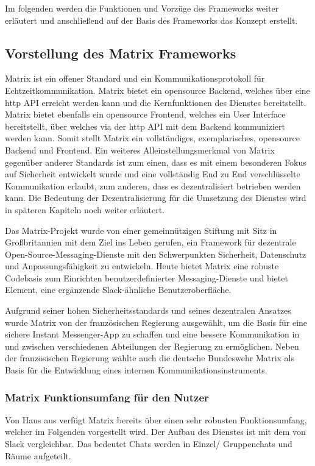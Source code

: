 Im folgenden werden die Funktionen und Vorzüge des Frameworks weiter erläutert und anschließend auf der Basis des Frameworks das Konzept erstellt. 

\subsection{Vorstellung des Matrix Frameworks}\label{chapter:vdmf}
Matrix ist ein offener Standard und ein Kommunikationsprotokoll für  Echtzeitkommunikation. Matrix bietet ein opensource Backend, welches über eine http API erreicht werden kann und die Kernfunktionen des Dienstes bereitstellt. Matrix bietet ebenfalls ein opensource Frontend, welches ein User Interface bereitstellt, über welches via der http API mit dem Backend kommuniziert werden kann. Somit stellt Matrix ein vollständiges, exemplarisches, opensource Backend und Frontend. Ein weiteres Alleinstellungsmerkmal von Matrix gegenüber anderer Standards ist zum einen, dass es mit einem besonderen Fokus auf Sicherheit entwickelt wurde und eine vollständig End zu End verschlüsselte Kommunikation  erlaubt, zum anderen, dass es dezentralisiert betrieben werden kann. Die Bedeutung der Dezentralisierung für die Umsetzung des Dienstes wird in späteren Kapiteln noch weiter erläutert.

Das Matrix-Projekt wurde von einer gemeinnützigen Stiftung mit Sitz in Großbritannien mit dem Ziel ins Leben gerufen, ein Framework für dezentrale Open-Source-Messaging-Dienste mit den Schwerpunkten Sicherheit, Datenschutz und Anpassungsfähigkeit zu entwickeln. Heute bietet Matrix eine robuste Codebasis zum Einrichten benutzerdefinierter Messaging-Dienste und bietet Element, eine ergänzende Slack-ähnliche Benutzeroberfläche.

Aufgrund seiner hohen Sicherheitsstandards und seines dezentralen Ansatzes wurde Matrix  von der französischen Regierung ausgewählt, um die Basis für eine sichere Instant Messenger-App zu schaffen und eine bessere Kommunikation in und zwischen verschiedenen Abteilungen der Regierung zu ermöglichen. Neben der französischen Regierung wählte auch die deutsche Bundeswehr Matrix als Basis für die Entwicklung eines internen Kommunikationsinstruments.

\subsubsection{Matrix Funktionsumfang für den Nutzer}\label{chapter:aemn}
Von Haus aus verfügt Matrix bereits über einen sehr robusten Funktionsumfang, welcher im Folgenden vorgestellt wird.
Der Aufbau des Dienstes ist mit dem von Slack vergleichbar. Das bedeutet Chats werden in Einzel/ Gruppenchats und Räume aufgeteilt. 

